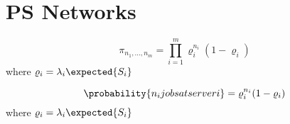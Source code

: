 \section{PS Networks}
\label{sec:PS-Networks}

\begin{theorem} [BCMP]
	\begin{equation}
	\label{eqn:BCMP}
	\pi_{n_{1},...,n_{m}} = \prod_{i=1}^{m} \varrho_{i}^{n_{i}} (1-\varrho_{i})
	\end{equation}
	where $\varrho_{i}=\lambda_{i}\expected{S_{i}}$
\end{theorem}

\begin{corollary}
	\begin{equation}
	\label{eqn:BCMP-Jobs-Server}
	\probability{n_{i} jobs at server i} = \varrho_{i}^{n_{i}} (1-\varrho_{i})
	\end{equation}
	where $\varrho_{i}=\lambda_{i}\expected{S_{i}}$
\end{corollary}